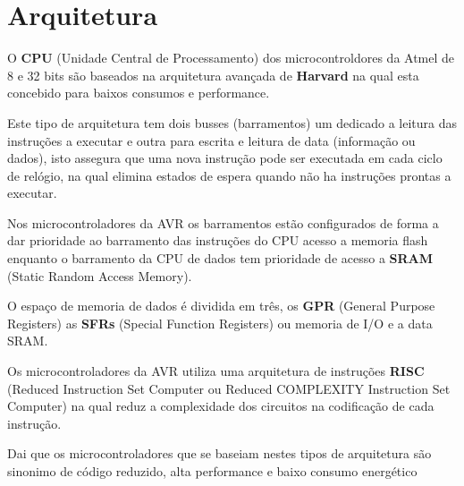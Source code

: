 \documentclass[titlepage, a4paper, 10pt, reqno, openany]{report}
\begin{document}
	\section{Arquitetura}
O {\bf CPU} (Unidade Central de Processamento) dos microcontroldores da Atmel de 8 e 32 bits s\~{a}o baseados na arquitetura avan\c{c}ada de {\bf Harvard} na qual esta concebido para baixos consumos e performance. \par
Este tipo de arquitetura tem dois  busses (barramentos) um dedicado a leitura das instru\c{c}\~{o}es a executar e outra para escrita e leitura de data (informa\c{c}\~{a}o ou dados), isto assegura que uma nova instru\c{c}\~{a}o pode ser executada em cada ciclo de rel\'{o}gio, na qual elimina estados de espera quando n\~{a}o ha instru\c{c}\~{o}es prontas a executar. \par
Nos microcontroladores da AVR os barramentos est\~{a}o configurados de forma a dar prioridade ao barramento das instru\c{c}\~{o}es do CPU acesso a memoria flash enquanto o barramento da CPU de dados tem prioridade de acesso a {\bf SRAM} (Static Random Access Memory). \par
O espa\c{c}o de memoria de dados \'{e} dividida em tr\^{e}s, os {\bf GPR} (General Purpose Registers) as {\bf SFRs} (Special Function Registers) ou memoria de I/O e a data SRAM. \par
Os microcontroladores da AVR utiliza uma arquitetura de instru\c{c}\~{o}es {\bf RISC} (Reduced Instruction Set Computer ou Reduced COMPLEXITY Instruction Set Computer) na qual reduz a complexidade dos circuitos na codifica\c{c}\~{a}o de cada instru\c{c}\~{a}o. \par
Dai que os microcontroladores que se baseiam nestes tipos de arquitetura s\~{a}o sinonimo de c\'{o}digo reduzido, alta performance e baixo consumo energ\'{e}tico \par
\end{document}
